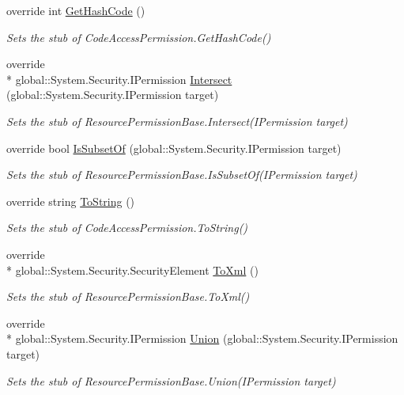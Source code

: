 \begin{DoxyCompactItemize}
override int \hyperlink{class_system_1_1_security_1_1_permissions_1_1_fakes_1_1_stub_resource_permission_base_afdd881b17f63b40bbdd0954a16a5db6f}{Get\-Hash\-Code} ()
\begin{DoxyCompactList}\small\item\em Sets the stub of Code\-Access\-Permission.\-Get\-Hash\-Code()\end{DoxyCompactList}\item 
override \\*
global\-::\-System.\-Security.\-I\-Permission \hyperlink{class_system_1_1_security_1_1_permissions_1_1_fakes_1_1_stub_resource_permission_base_a4fa9a20c404e09b735e0cf0a6e942a6d}{Intersect} (global\-::\-System.\-Security.\-I\-Permission target)
\begin{DoxyCompactList}\small\item\em Sets the stub of Resource\-Permission\-Base.\-Intersect(\-I\-Permission target)\end{DoxyCompactList}\item 
override bool \hyperlink{class_system_1_1_security_1_1_permissions_1_1_fakes_1_1_stub_resource_permission_base_ac69409748e51d1eb1223c3d46f806be1}{Is\-Subset\-Of} (global\-::\-System.\-Security.\-I\-Permission target)
\begin{DoxyCompactList}\small\item\em Sets the stub of Resource\-Permission\-Base.\-Is\-Subset\-Of(\-I\-Permission target)\end{DoxyCompactList}\item 
override string \hyperlink{class_system_1_1_security_1_1_permissions_1_1_fakes_1_1_stub_resource_permission_base_a4def24644886ca7584b088109791775d}{To\-String} ()
\begin{DoxyCompactList}\small\item\em Sets the stub of Code\-Access\-Permission.\-To\-String()\end{DoxyCompactList}\item 
override \\*
global\-::\-System.\-Security.\-Security\-Element \hyperlink{class_system_1_1_security_1_1_permissions_1_1_fakes_1_1_stub_resource_permission_base_a47075f627bdc9e94ca46da678f376351}{To\-Xml} ()
\begin{DoxyCompactList}\small\item\em Sets the stub of Resource\-Permission\-Base.\-To\-Xml()\end{DoxyCompactList}\item 
override \\*
global\-::\-System.\-Security.\-I\-Permission \hyperlink{class_system_1_1_security_1_1_permissions_1_1_fakes_1_1_stub_resource_permission_base_a7f34077351baad5a66a52d1a9a7bd4ad}{Union} (global\-::\-System.\-Security.\-I\-Permission target)
\begin{DoxyCompactList}\small\item\em Sets the stub of Resource\-Permission\-Base.\-Union(\-I\-Permission target)\end{DoxyCompactList}\end{DoxyCompactItemize}
